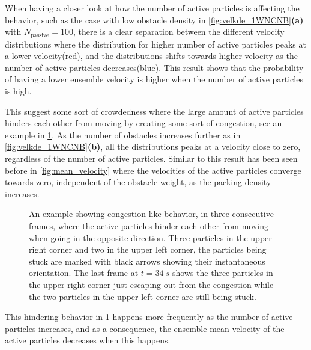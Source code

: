 When having a closer look at how the number of 
active particles is affecting the behavior, 
such as the case with low obstacle density in 
\cref{fig:velkde_1WNCNB}\textbf{(a)} with 
$N_{\text{passive}}=100$, there is a clear separation 
between the different velocity distributions where the 
distribution for higher number of active particles peaks 
at a lower velocity(red), and the distributions shifts 
towards higher velocity as the number of active particles decreases(blue).
This result shows that the probability of having a lower 
ensemble velocity is higher when the number of active particles is high.

This suggest some sort of crowdedness where the large 
amount of active particles hinders each other from moving 
by creating some sort of congestion, see an example in 
\cref{fig:0W300C25B_congestion}. As the number of obstacles 
increases further as in \cref{fig:velkde_1WNCNB}\textbf{(b)}, 
all the distributions peaks at a velocity close to zero, 
regardless of the number of active particles. Similar to this result 
has been seen before in \cref{fig:mean_velocity} 
where the velocities of the active particles converge towards zero, 
independent of the obstacle weight, as the packing density increases.    


\begin{figure}[H]
\centering
 \quad
{} \quad
{} \quad
\caption{An example showing congestion like behavior, in three consecutive frames,  where the active particles hinder each 
other from moving when going in the opposite direction. Three particles in the upper right corner and 
two in the upper left corner, the particles being stuck are marked with black arrows showing their instantaneous orientation. 
The last frame at $t=\SI{34}{s}$ shows the three particles in the upper right corner just escaping out from the congestion 
while the two particles in the upper left corner are still being stuck.}
\label{fig:0W300C25B_congestion}
\end{figure}



This hindering behavior in \cref{fig:0W300C25B_congestion} happens more frequently as the number of active particles increases, and 
as a consequence, the ensemble mean velocity of the active particles decreases when this happens. 

